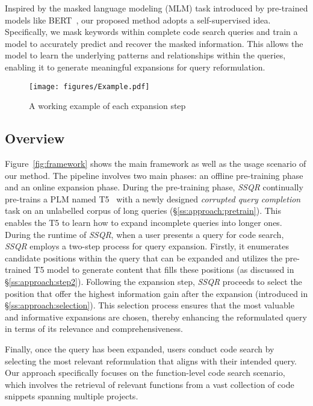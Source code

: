 \documentclass[sigconf,screen]{acmart}
\newcommand{\ourmethod}{\textit{SSQR}\xspace}
\begin{document}
Inspired by the masked language modeling (MLM) task introduced by pre-trained models like BERT~\cite{BERT}, our proposed method adopts a self-supervised idea. Specifically, we mask keywords within complete code search queries and train a model to accurately predict and recover the masked information. This allows the model to learn the underlying patterns and relationships within the queries, enabling it to generate meaningful expansions for query reformulation.

\begin{figure*}[t]
 \centering
  \texttt{[image: figures/Example.pdf]}
  \caption{A working example of each expansion step}
  \label{fig:example}
\end{figure*}

\subsection{Overview}
Figure~\ref{fig:framework} shows the main framework as well as the usage scenario of our method. The pipeline involves two main phases: an offline pre-training phase and an online expansion phase. 
During the pre-training phase, \ourmethod continually pre-trains a PLM named T5~\cite{t5} with a newly designed \textit{corrupted query completion} task on an unlabelled corpus of long queries (\S \ref{ss:approach:pretrain}). This enables the T5 to learn how to expand incomplete queries into longer ones. 
During the runtime of \ourmethod, when a user presents a query for code search, \ourmethod employs a two-step process for query expansion. Firstly, it enumerates candidate positions within the query that can be expanded and utilizes the pre-trained T5 model to generate content that fills these positions (as discussed in \S \ref{ss:approach:step2}). 
Following the expansion step, \ourmethod proceeds to select the position that offer the highest information gain after the expansion (introduced in \S \ref{ss:approach:selection}). This selection process ensures that the most valuable and informative expansions are chosen, thereby enhancing the reformulated query in terms of its relevance and comprehensiveness.

Finally, once the query has been expanded, users conduct code search by selecting the most relevant reformulation that aligns with their intended query. Our approach specifically focuses on the function-level code search scenario, which involves the retrieval of relevant functions from a vast collection of code snippets spanning multiple projects.
\end{document}
